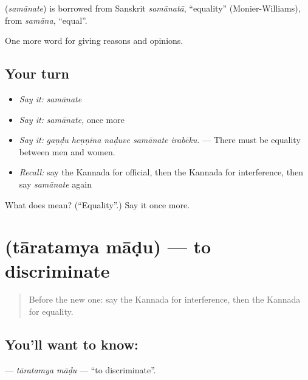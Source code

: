 \begin{cousinweb}
\textbf{} (\emph{samānate}) is borrowed from Sanskrit \emph{samānatā}, \textquotedblleft{}equality\textquotedblright{} (Monier-Williams), from \emph{samāna}, \textquotedblleft{}equal\textquotedblright{}.
\end{cousinweb}

\begin{grammarlens}[title={What you've built}]
One more word for giving reasons and opinions.
\end{grammarlens}

\subsection*{Your turn}
\begin{itemize}
\raggedright
  \item \emph{Say it:} \emph{samānate}
  \item \emph{Say it:} \emph{samānate}, once more
  \item \emph{Say it:} \emph{gaṇḍu heṇṇina naḍuve samānate irabēku.} — There must be equality between men and women.
  \item \emph{Recall:} say the Kannada for official, then the Kannada for interference, then say \emph{samānate} again
\end{itemize}

\begin{tcolorbox}[breakable,colback=teal!4,colframe=teal!35!black,title={Before you move on}]
What does  mean? (\textquotedblleft{}Equality\textquotedblright{}.) Say it once more.
\end{tcolorbox}
\section[\texorpdfstring{\kn{ತಾರತಮ್ಯ} \kn{ಮಾಡು} (tāratamya māḍu)}{ತಾರತಮ್ಯ ಮಾಡು (tāratamya māḍu)}]{  (tāratamya māḍu) — to discriminate}

\label{lesson:KA-C391-taratamya-madu}



\begin{quote}
Before the new one: say the Kannada for interference, then the Kannada for equality.
\end{quote}

\subsection*{You'll want to know:  }
\textbf{ } — \emph{tāratamya māḍu} — \textquotedblleft{}to discriminate\textquotedblright{}.


